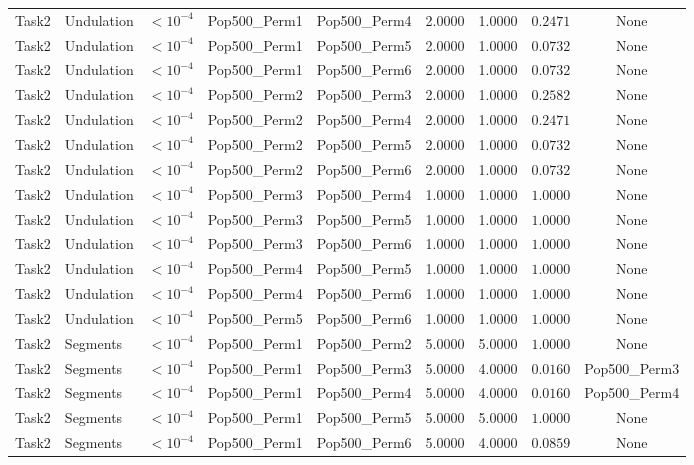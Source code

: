 \documentclass[8pt]{article}
\begin{document}
\begin{longtable}{llccccccc}
Task2 & Undulation & $< 10^{-4}$ & Pop500\_Perm1 & Pop500\_Perm4 & 2.0000 & 1.0000 & $0.2471$ & None \\
Task2 & Undulation & $< 10^{-4}$ & Pop500\_Perm1 & Pop500\_Perm5 & 2.0000 & 1.0000 & $0.0732$ & None \\
Task2 & Undulation & $< 10^{-4}$ & Pop500\_Perm1 & Pop500\_Perm6 & 2.0000 & 1.0000 & $0.0732$ & None \\
Task2 & Undulation & $< 10^{-4}$ & Pop500\_Perm2 & Pop500\_Perm3 & 2.0000 & 1.0000 & $0.2582$ & None \\
Task2 & Undulation & $< 10^{-4}$ & Pop500\_Perm2 & Pop500\_Perm4 & 2.0000 & 1.0000 & $0.2471$ & None \\
Task2 & Undulation & $< 10^{-4}$ & Pop500\_Perm2 & Pop500\_Perm5 & 2.0000 & 1.0000 & $0.0732$ & None \\
Task2 & Undulation & $< 10^{-4}$ & Pop500\_Perm2 & Pop500\_Perm6 & 2.0000 & 1.0000 & $0.0732$ & None \\
Task2 & Undulation & $< 10^{-4}$ & Pop500\_Perm3 & Pop500\_Perm4 & 1.0000 & 1.0000 & $1.0000$ & None \\
Task2 & Undulation & $< 10^{-4}$ & Pop500\_Perm3 & Pop500\_Perm5 & 1.0000 & 1.0000 & $1.0000$ & None \\
Task2 & Undulation & $< 10^{-4}$ & Pop500\_Perm3 & Pop500\_Perm6 & 1.0000 & 1.0000 & $1.0000$ & None \\
Task2 & Undulation & $< 10^{-4}$ & Pop500\_Perm4 & Pop500\_Perm5 & 1.0000 & 1.0000 & $1.0000$ & None \\
Task2 & Undulation & $< 10^{-4}$ & Pop500\_Perm4 & Pop500\_Perm6 & 1.0000 & 1.0000 & $1.0000$ & None \\
Task2 & Undulation & $< 10^{-4}$ & Pop500\_Perm5 & Pop500\_Perm6 & 1.0000 & 1.0000 & $1.0000$ & None \\
Task2 & Segments & $< 10^{-4}$ & Pop500\_Perm1 & Pop500\_Perm2 & 5.0000 & 5.0000 & $1.0000$ & None \\
Task2 & Segments & $< 10^{-4}$ & Pop500\_Perm1 & Pop500\_Perm3 & 5.0000 & 4.0000 & $0.0160$ & Pop500\_Perm3 \\
Task2 & Segments & $< 10^{-4}$ & Pop500\_Perm1 & Pop500\_Perm4 & 5.0000 & 4.0000 & $0.0160$ & Pop500\_Perm4 \\
Task2 & Segments & $< 10^{-4}$ & Pop500\_Perm1 & Pop500\_Perm5 & 5.0000 & 5.0000 & $1.0000$ & None \\
Task2 & Segments & $< 10^{-4}$ & Pop500\_Perm1 & Pop500\_Perm6 & 5.0000 & 4.0000 & $0.0859$ & None \\

\end{longtable}
\end{document}
